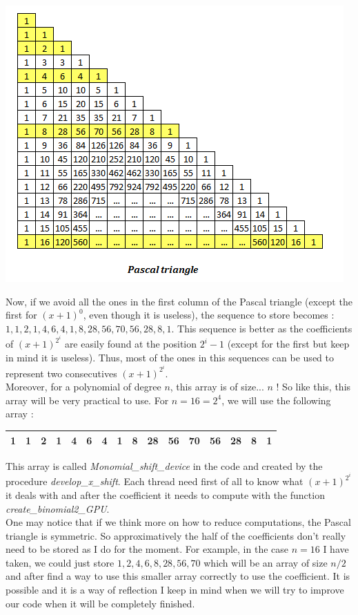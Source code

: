 \begin{center}
\includegraphics[scale=1]{PascalTriangle.png}
\end{center}

Now, if we avoid all the ones in the first column of the Pascal triangle (except the first for $(x+1)^0$, even though it is useless), the sequence to store becomes : $1,1,2,1,4,6,4,1,8,28,56,70,56,28,8,1$. This sequence is better as the coefficients of $(x+1)^{2^i}$ are easily found at the position $2^i-1$ (except for the first but keep in mind it is useless). Thus, most of the ones in this sequences can be used to represent two consecutives $(x+1)^{2^i}$.\\

Moreover, for a polynomial of degree $n$, this array is of size... $n$ ! So like this, this array will be very practical to use. For $n = 16 = 2^4$, we will use the following array :\\

\begin{center}
\begin{tabular}{|c||c||c|c||c|c|c|c||c|c|c|c|c|c|c|c|} \hline
1 & 1 & 2 & 1 & 4 & 6 & 4 & 1 & 8 & 28 & 56 & 70 & 56 & 28 & 8 & 1 \\ \hline
\end{tabular}
\end{center}

This array is called \textit{Monomial\_shift\_device} in the code and created by the procedure \textit{develop\_x\_shift}. Each thread need first of all to know what $(x+1)^{2^i}$ it deals with and after the coefficient it needs to compute with the function \textit{create\_binomial2\_GPU}.\\

One may notice that if we think more on how to reduce computations, the Pascal triangle is symmetric. So approximatively the half of the coefficients don't really need to be stored as I do for the moment. For example, in the case $n=16$ I have taken, we could just store $1,2,4,6,8,28,56,70$ which will be an array of size $n/2$ and after find a way to use this smaller array correctly to use the coefficient. It is possible and it is a way of reflection I keep in mind when we will try to improve our code when it will be completely finished.\\
